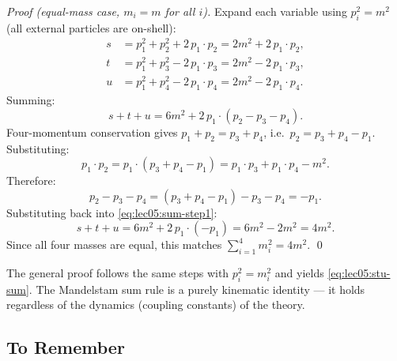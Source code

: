 \documentclass[../main.tex]{subfiles}
\begin{document}
\begin{proof}[Proof (equal-mass case, $m_i = m$ for all $i$)]
Expand each variable using $p_i^2 = m^2$ (all external particles are on-shell):
\begin{align}
  s &= p_1^2 + p_2^2 + 2\,p_1\cdot p_2
     = 2m^2 + 2\,p_1\cdot p_2,
  \label{eq:lec05:s-expand}\\
  t &= p_1^2 + p_3^2 - 2\,p_1\cdot p_3
     = 2m^2 - 2\,p_1\cdot p_3,
  \label{eq:lec05:t-expand}\\
  u &= p_1^2 + p_4^2 - 2\,p_1\cdot p_4
     = 2m^2 - 2\,p_1\cdot p_4.
  \label{eq:lec05:u-expand}
\end{align}
Summing:
\begin{equation}
  s + t + u = 6m^2 + 2\,p_1\cdot(p_2 - p_3 - p_4).
  \label{eq:lec05:sum-step1}
\end{equation}
Four-momentum conservation gives $p_1 + p_2 = p_3 + p_4$, i.e.\ $p_2 = p_3 + p_4 - p_1$.  Substituting:
\begin{equation}
  p_1 \cdot p_2
  = p_1 \cdot (p_3 + p_4 - p_1)
  = p_1\cdot p_3 + p_1\cdot p_4 - m^2.
  \label{eq:lec05:p1p2-sub}
\end{equation}
Therefore:
\begin{equation}
  p_2 - p_3 - p_4
  = (p_3 + p_4 - p_1) - p_3 - p_4
  = -p_1.
  \label{eq:lec05:momentum-difference}
\end{equation}
Substituting back into \eqref{eq:lec05:sum-step1}:
\begin{equation}
  s + t + u
  = 6m^2 + 2\,p_1 \cdot (-p_1)
  = 6m^2 - 2m^2
  = 4m^2.
  \label{eq:lec05:stu-equal-mass}
\end{equation}
Since all four masses are equal, this matches $\sum_{i=1}^4 m_i^2 = 4m^2$. \qed
\end{proof}

The general proof follows the same steps with $p_i^2 = m_i^2$ and yields \eqref{eq:lec05:stu-sum}.  The Mandelstam sum rule is a purely kinematic identity — it holds regardless of the dynamics (coupling constants) of the theory.

\subsection*{To Remember}
\end{document}
